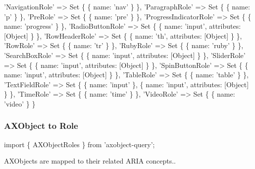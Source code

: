 \begin{DoxyCode}
  'NavigationRole' => Set \{ \{ name: 'nav' \} \},
  'ParagraphRole' => Set \{ \{ name: 'p' \} \},
  'PreRole' => Set \{ \{ name: 'pre' \} \},
  'ProgressIndicatorRole' => Set \{ \{ name: 'progress' \} \},
  'RadioButtonRole' => Set \{ \{ name: 'input', attributes: [Object] \} \},
  'RowHeaderRole' => Set \{ \{ name: 'th', attributes: [Object] \} \},
  'RowRole' => Set \{ \{ name: 'tr' \} \},
  'RubyRole' => Set \{ \{ name: 'ruby' \} \},
  'SearchBoxRole' => Set \{ \{ name: 'input', attributes: [Object] \} \},
  'SliderRole' => Set \{ \{ name: 'input', attributes: [Object] \} \},
  'SpinButtonRole' => Set \{ \{ name: 'input', attributes: [Object] \} \},
  'TableRole' => Set \{ \{ name: 'table' \} \},
  'TextFieldRole' => Set \{ \{ name: 'input' \}, \{ name: 'input', attributes: [Object] \} \},
  'TimeRole' => Set \{ \{ name: 'time' \} \},
  'VideoRole' => Set \{ \{ name: 'video' \}
\}
\end{DoxyCode}


\subsubsection*{A\+X\+Object to Role}


\begin{DoxyCode}
import \{ AXObjectRoles \} from 'axobject-query';
\end{DoxyCode}


A\+X\+Objects are mapped to their related A\+R\+IA concepts..



